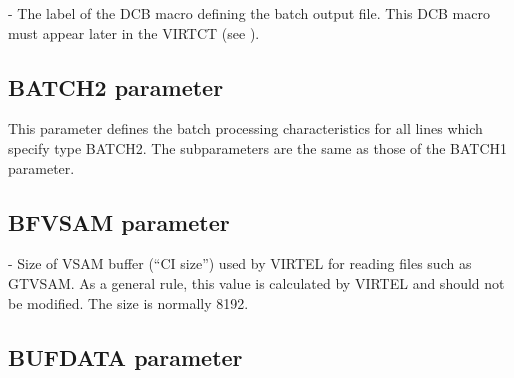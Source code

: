 \documentclass[letterpaper,10pt,english]{sphinxmanual}
\begin{document}
 - The label of the DCB macro defining the batch output file. This DCB macro must appear later in the VIRTCT (see {\hyperref[\detokenize{Installation_Guide:vvrrig-bookmark72}]{}}).


\subsection{BATCH2 parameter}
\label{\detokenize{Installation_Guide:index-38}}\label{\detokenize{Installation_Guide:batch2-parameter}}
\begin{sphinxVerbatim}[commandchars=\\\{\}]
    
\end{sphinxVerbatim}

This parameter defines the batch processing characteristics for all lines which specify type BATCH2. The subparameters are the same as those of the BATCH1 parameter.


\subsection{BFVSAM parameter}
\label{\detokenize{Installation_Guide:index-39}}\label{\detokenize{Installation_Guide:bfvsam-parameter}}
\begin{sphinxVerbatim}[commandchars=\\\{\}]
 
\end{sphinxVerbatim}

 - Size of VSAM buffer (“CI size”) used by VIRTEL for reading files such as GTVSAM. As a general rule, this value is calculated by VIRTEL and should not be modified. The size is normally 8192.


\subsection{BUFDATA parameter}
\label{\detokenize{Installation_Guide:bufdata-parameter}}\label{\detokenize{Installation_Guide:index-40}}
\begin{sphinxVerbatim}[commandchars=\\\{\}]
 
\end{sphinxVerbatim}
\end{document}
